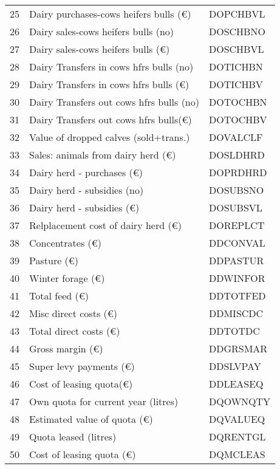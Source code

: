 \documentclass{article}\usepackage{graphicx, color}
\begin{document}
\begin{flushleft}
\begin{table}[ht]
\begin{center}
\begin{tabular}{rll}
  25 & Dairy purchases-cows heifers bulls (€) & DOPCHBVL \\ 
  26 & Dairy sales-cows heifers bulls  (no) & DOSCHBNO \\ 
  27 & Dairy sales-cows heifers bulls  (€) & DOSCHBVL \\ 
  28 & Dairy Transfers in cows hfrs bulls (no) & DOTICHBN \\ 
  29 & Dairy Transfers in cows hfrs bulls (€) & DOTICHBV \\ 
  30 & Dairy Transfers out cows hfrs bulls (no) & DOTOCHBN \\ 
  31 & Dairy Transfers out cows hfrs bulls(€) & DOTOCHBV \\ 
  32 & Value of dropped calves (sold+trans.) & DOVALCLF \\ 
  33 & Sales: animals from dairy herd   (€) & DOSLDHRD \\ 
  34 & Dairy herd - purchases           (€) & DOPRDHRD \\ 
  35 & Dairy herd - subsidies     (no) & DOSUBSNO \\ 
  36 & Dairy herd - subsidies     (€) & DOSUBSVL \\ 
  37 & Relplacement cost of dairy herd  (€) & DOREPLCT \\ 
  38 & Concentrates         (€) & DDCONVAL \\ 
  39 & Pasture              (€) & DDPASTUR \\ 
  40 & Winter forage        (€) & DDWINFOR \\ 
  41 & Total feed           (€) & DDTOTFED \\ 
  42 & Misc direct costs    (€) & DDMISCDC \\ 
  43 & Total direct costs   (€) & DDTOTDC \\ 
  44 & Gross margin         (€) & DDGRSMAR \\ 
  45 & Super levy payments  (€) & DDSLVPAY \\ 
  46 & Cost of leasing quota(€) & DDLEASEQ \\ 
  47 & Own quota for current year (litres) & DQOWNQTY \\ 
  48 & Estimated value of quota   (€) & DQVALUEQ \\ 
  49 & Quota leased               (litres) & DQRENTGL \\ 
  50 & Cost of leasing quota      (€) & DQMCLEAS \\ 
   \hline
\end{tabular}
\end{center}
\end{table}



\end{flushleft}
\end{document}
